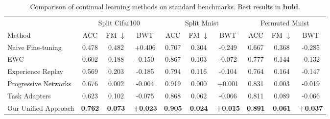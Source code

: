
\begin{table}[ht]
\centering
\caption{Comparison of continual learning methods on standard benchmarks. Best results in \textbf{bold}.}
\label{tab:main_results}
\begin{tabular}{l|ccc|ccc|ccc|}
\toprule
& \multicolumn{3}{c|}{Split Cifar100} & \multicolumn{3}{c|}{Split Mnist} & \multicolumn{3}{c|}{Permuted Mnist} \\
Method & ACC & FM $\downarrow$ & BWT & ACC & FM $\downarrow$ & BWT & ACC & FM $\downarrow$ & BWT \\
\midrule
Naive Fine-tuning & 0.478 & 0.482 & +0.406 & 0.707 & 0.304 & -0.249 & 0.667 & 0.368 & -0.285 \\
EWC & 0.602 & 0.188 & -0.150 & 0.867 & 0.103 & -0.072 & 0.777 & 0.144 & -0.132 \\
Experience Replay & 0.569 & 0.203 & -0.185 & 0.794 & 0.116 & -0.104 & 0.764 & 0.164 & -0.147 \\
Progressive Networks & 0.676 & 0.002 & -0.004 & 0.919 & 0.000 & +0.001 & 0.831 & 0.003 & -0.019 \\
Task Adapters & 0.623 & 0.102 & -0.075 & 0.868 & 0.062 & -0.066 & 0.811 & 0.089 & -0.066 \\
Our Unified Approach & \textbf{0.762} & \textbf{0.073} & \textbf{+0.023} & \textbf{0.905} & \textbf{0.024} & \textbf{+0.015} & \textbf{0.891} & \textbf{0.061} & \textbf{+0.037} \\
\bottomrule
\end{tabular}
\end{table}
